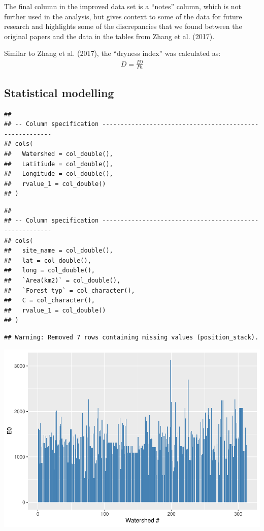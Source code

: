 \documentclass[]{elsarticle} %
\begin{document}
The final column in the improved data set is a ``notes'' column, which
is not further used in the analysis, but gives context to some of the
data for future research and highlights some of the discrepancies that
we found between the original papers and the data in the tables from
Zhang et al. (2017).

Similar to Zhang et al. (2017), the ``dryness index'' was calculated as:
\[\tag{1}
\begin{aligned}
D = \frac{E0}{Pa}
\end{aligned}\]

\hypertarget{statistical-modelling}{%
\subsection{Statistical modelling}\label{statistical-modelling}}

\begin{verbatim}
## 
## -- Column specification --------------------------------------------------------
## cols(
##   Watershed = col_double(),
##   Latitiude = col_double(),
##   Longitude = col_double(),
##   rvalue_1 = col_double()
## )
\end{verbatim}

\begin{verbatim}
## 
## -- Column specification --------------------------------------------------------
## cols(
##   site_name = col_double(),
##   lat = col_double(),
##   long = col_double(),
##   `Area(km2)` = col_double(),
##   `Forest typ` = col_character(),
##   C = col_character(),
##   rvalue_1 = col_double()
## )
\end{verbatim}

\begin{verbatim}
## Warning: Removed 7 rows containing missing values (position_stack).
\end{verbatim}

\includegraphics{Forest_and_Water_files/figure-latex/unnamed-chunk-3-1.pdf}
\end{document}
